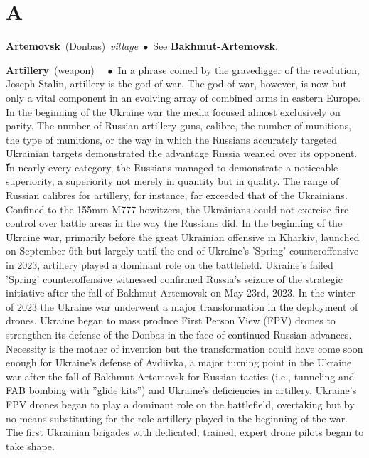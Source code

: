 \documentclass[10pt,a4paper,twoside]{article} %
\newcommand{\entry}[4]{\markboth{#1}{#1}\textbf{#1}\ {(#2)}\ \textit{#3}\ $\bullet$\ {#4}}  %
\begin{document}

\section*{A}

\begin{multicols}{2}

\entry{Artemovsk} {Donbas} {village} {See \textbf{Bakhmut-Artemovsk}.}

\entry{Artillery} {weapon} { } {In a phrase coined by the gravedigger of the revolution, Joseph Stalin, artillery is the god of war. The god of war, however, is now but only a vital component in an evolving array of combined arms in eastern Europe. In the beginning of the Ukraine war the  media focused almost exclusively on parity. The number of Russian artillery guns, calibre, the number of munitions, the type of munitions, or the way in which the Russians accurately targeted Ukrainian targets demonstrated the advantage Russia weaned over its opponent. ّIn nearly every category, the Russians managed to demonstrate a noticeable superiority, a superiority not merely in quantity but in quality. The range of Russian calibres for artillery, for instance, far exceeded that of the Ukrainians. Confined to the 155mm M777 howitzers, the Ukrainians could not exercise fire control over battle areas in the way the Russians did. \newline \indent In the beginning of the Ukraine war, primarily before the great Ukrainian offensive in Kharkiv, launched on September 6th but largely until the end of Ukraine's 'Spring' counteroffensive in 2023, artillery played a dominant role on the battlefield. Ukraine's failed 'Spring' counteroffensive witnessed confirmed Russia's seizure of the strategic initiative after the fall of Bakhmut-Artemovsk on May 23rd, 2023. In the winter of 2023 the Ukraine war underwent a major transformation in the deployment of drones. Ukraine began to mass produce First Person View (FPV) drones to strengthen its defense of the Donbas in the face of continued Russian advances. Necessity is the mother of invention but the transformation could have come soon enough for Ukraine's defense of Avdiivka, a major turning point in the Ukraine war after the fall of Bakhmut-Artemovsk for Russian tactics (i.e., tunneling and FAB bombing with ”glide kits”) and Ukraine's deficiencies in artillery. Ukraine's FPV drones began to play a dominant role on the battlefield, overtaking but by no means substituting for the role artillery played in the beginning of the war. The first Ukrainian brigades with dedicated, trained, expert drone pilots began to take shape.}


\end{multicols}
\end{document}
